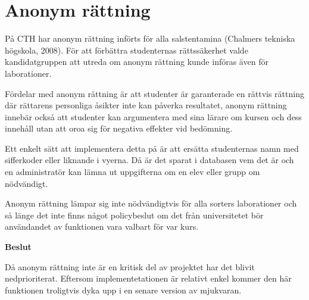 \section{Anonym rättning}

På CTH har anonym rättning införts för alla salstentamina (Chalmers tekniska högskola, 2008). För att förbättra studenternas rättssäkerhet valde kandidatgruppen att utreda om anonym rättning kunde införas även för laborationer.

Fördelar med anonym rättning är att studenter är garanterade en rättvis rättning där rättarens personliga åsikter inte kan påverka resultatet, anonym rättning innebär också att studenter kan argumentera med sina lärare om kursen och dess innehåll utan att oroa sig för negativa effekter vid bedömning.

Ett enkelt sätt att implementera detta på är att ersätta studenternas namn med sifferkoder eller liknande i vyerna. Då är det sparat i databasen vem det är och en administratör kan lämna ut uppgifterna om en elev eller grupp om nödvändigt.

Anonym rättning lämpar sig inte nödvändigtvis för alla sorters laborationer och så länge det inte finns något policybeslut om det från universitetet bör användandet av funktionen vara valbart för var kurs.

\begin{flushright}

  \textbf{Beslut}

  Då anonym rättning inte är en kritisk del av projektet har det blivit nedprioriterat.
Eftersom implementetationen är relativt enkel kommer den här funktionen troligtvis dyka upp i en senare version av mjukvaran.
\end{flushright}
